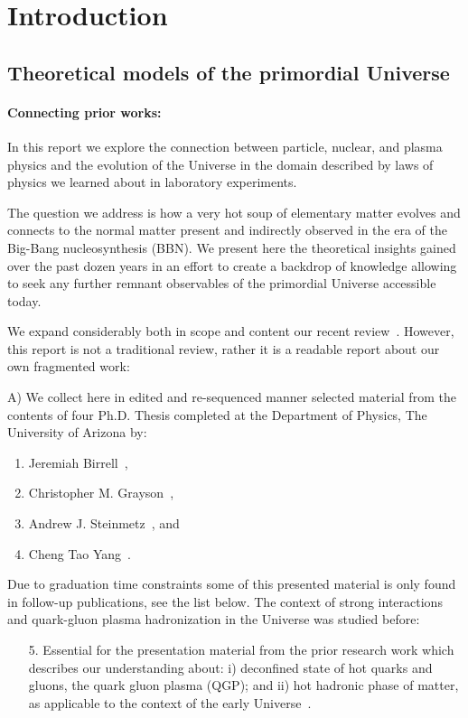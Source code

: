 \section{Introduction}
\subsection{Theoretical models of the primordial Universe}\label{ssec:UniLab}
\paragraph{Connecting prior works:}
In this report we explore the connection between particle, nuclear, and plasma physics and the evolution of the Universe in the domain described by laws of physics we learned about in laboratory experiments.

The question we address is how a very hot soup of elementary matter evolves and connects to the normal matter present and indirectly observed in the era of the Big-Bang nucleosynthesis (BBN). We present here the theoretical insights gained over the past dozen years in an effort to create a backdrop of knowledge allowing to seek any further remnant observables of the primordial Universe accessible today.

We expand considerably both in scope and content our recent review~\cite{Rafelski:2023emw}. However, this report is not a traditional review, rather it is a readable report about our own fragmented work: 

A) We collect here in edited and re-sequenced manner selected material from the contents of four Ph.D. Thesis completed at the Department of Physics, The University of Arizona by:
\begin{enumerate}
\item Jeremiah Birrell~\cite{Birrell:2014ona},
\item Christopher M. Grayson~\cite{Grayson:2024okq},
\item Andrew J. Steinmetz~\cite{Steinmetz:2023ucp}, and
\item Cheng Tao Yang~\cite{Yang:2024ret}.
\end{enumerate}
Due to graduation time constraints some of this presented material is only found in follow-up publications, see the list below. The context of strong interactions and quark-gluon plasma hadronization in the Universe was studied before:
\begin{enumerate}
\item[5.] Essential for the presentation material from the prior research work  which describes our understanding about: i) deconfined state of hot quarks and gluons, the quark gluon plasma (QGP); and ii) hot hadronic phase of matter, as applicable to the context of the early Universe~\cite{Rafelski:2015cxa,Rafelski:2016hnq,Letessier:2002ony}.
\end{enumerate}

